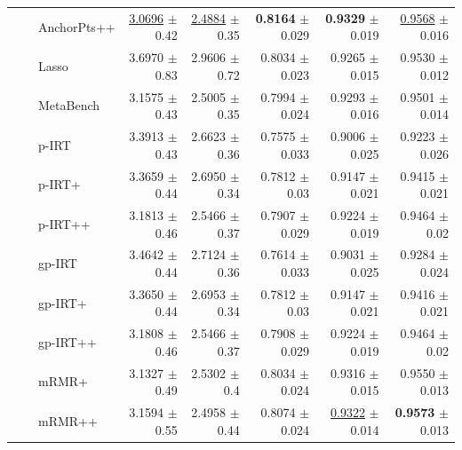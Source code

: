 \begin{longtable}{llp{}rrrrr}
 &  & AnchorPts++ & \underline{3.0696} {\scriptsize $\pm$ 0.42} & \underline{2.4884} {\scriptsize $\pm$ 0.35} & \textbf{0.8164} {\scriptsize $\pm$ 0.029} & \textbf{0.9329} {\scriptsize $\pm$ 0.019} & \underline{0.9568} {\scriptsize $\pm$ 0.016} \\
 &  & Lasso & 3.6970 {\scriptsize $\pm$ 0.83} & 2.9606 {\scriptsize $\pm$ 0.72} & 0.8034 {\scriptsize $\pm$ 0.023} & 0.9265 {\scriptsize $\pm$ 0.015} & 0.9530 {\scriptsize $\pm$ 0.012} \\
 &  & MetaBench & 3.1575 {\scriptsize $\pm$ 0.43} & 2.5005 {\scriptsize $\pm$ 0.35} & 0.7994 {\scriptsize $\pm$ 0.024} & 0.9293 {\scriptsize $\pm$ 0.016} & 0.9501 {\scriptsize $\pm$ 0.014} \\
 &  & p-IRT & 3.3913 {\scriptsize $\pm$ 0.43} & 2.6623 {\scriptsize $\pm$ 0.36} & 0.7575 {\scriptsize $\pm$ 0.033} & 0.9006 {\scriptsize $\pm$ 0.025} & 0.9223 {\scriptsize $\pm$ 0.026} \\
 &  & p-IRT+ & 3.3659 {\scriptsize $\pm$ 0.44} & 2.6950 {\scriptsize $\pm$ 0.34} & 0.7812 {\scriptsize $\pm$ 0.03} & 0.9147 {\scriptsize $\pm$ 0.021} & 0.9415 {\scriptsize $\pm$ 0.021} \\
 &  & p-IRT++ & 3.1813 {\scriptsize $\pm$ 0.46} & 2.5466 {\scriptsize $\pm$ 0.37} & 0.7907 {\scriptsize $\pm$ 0.029} & 0.9224 {\scriptsize $\pm$ 0.019} & 0.9464 {\scriptsize $\pm$ 0.02} \\
 &  & gp-IRT & 3.4642 {\scriptsize $\pm$ 0.44} & 2.7124 {\scriptsize $\pm$ 0.36} & 0.7614 {\scriptsize $\pm$ 0.033} & 0.9031 {\scriptsize $\pm$ 0.025} & 0.9284 {\scriptsize $\pm$ 0.024} \\
 &  & gp-IRT+ & 3.3650 {\scriptsize $\pm$ 0.44} & 2.6953 {\scriptsize $\pm$ 0.34} & 0.7812 {\scriptsize $\pm$ 0.03} & 0.9147 {\scriptsize $\pm$ 0.021} & 0.9416 {\scriptsize $\pm$ 0.021} \\
 &  & gp-IRT++ & 3.1808 {\scriptsize $\pm$ 0.46} & 2.5466 {\scriptsize $\pm$ 0.37} & 0.7908 {\scriptsize $\pm$ 0.029} & 0.9224 {\scriptsize $\pm$ 0.019} & 0.9464 {\scriptsize $\pm$ 0.02} \\
 &  & mRMR+ & 3.1327 {\scriptsize $\pm$ 0.49} & 2.5302 {\scriptsize $\pm$ 0.4} & 0.8034 {\scriptsize $\pm$ 0.024} & 0.9316 {\scriptsize $\pm$ 0.015} & 0.9550 {\scriptsize $\pm$ 0.013} \\
 &  & mRMR++ & 3.1594 {\scriptsize $\pm$ 0.55} & 2.4958 {\scriptsize $\pm$ 0.44} & 0.8074 {\scriptsize $\pm$ 0.024} & \underline{0.9322} {\scriptsize $\pm$ 0.014} & \textbf{0.9573} {\scriptsize $\pm$ 0.013} \\
\midrule

\end{longtable}
